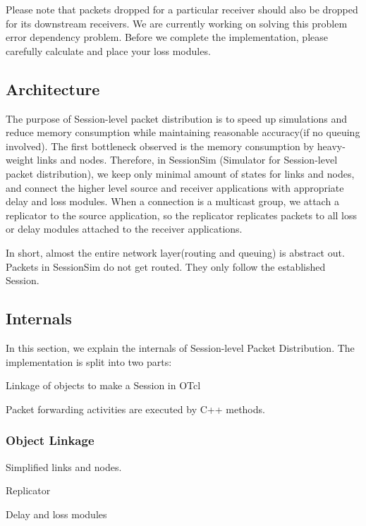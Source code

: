 \documentclass{article}
\begin{document}
Please note that packets dropped for a particular receiver should also 
be dropped for its downstream receivers.  We are currently
working on solving this problem error dependency problem.  Before 
we complete the implementation, please carefully calculate and 
place your loss modules.

\subsection{Architecture}
\label{sec:session-arch}
The purpose of Session-level packet distribution is to
speed up simulations and reduce memory consumption while 
maintaining reasonable accuracy(if no queuing involved).  The first
bottleneck observed is the memory consumption by heavy-weight
links and nodes.  Therefore, in SessionSim (Simulator for Session-level
packet distribution), we keep only minimal amount of 
states for links and nodes, and connect the higher level source and 
receiver applications with appropriate delay and loss modules.  When
a connection is a multicast group, we attach a replicator 
to the source application, so the replicator replicates packets
to all loss or delay modules attached to the receiver applications.

In short, almost the entire network layer(routing and queuing)
is abstract out.  Packets in SessionSim do not get routed.  
They only follow the established Session.

\subsection{Internals}
In this section, we explain the internals of Session-level Packet 
Distribution.  The implementation is split into two parts:
\begin{list}{}{}
\item  Linkage of objects to make a Session in OTcl 
\item  Packet forwarding activities are executed by C++ methods.  
\end{list}

\subsubsection{Object Linkage}
\label{sec:session-objlink}

\begin{list}{}{}
\item  Simplified links and nodes.
\item  Replicator
\item  Delay and loss modules
\end{list}
\end{document}
